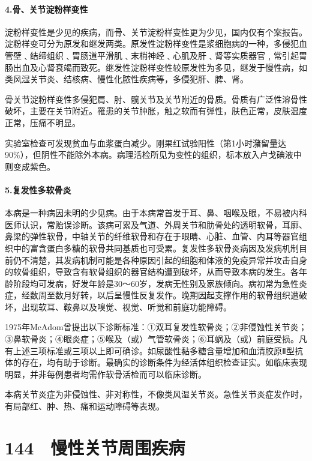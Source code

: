 \paragraph{4.骨、关节淀粉样变性}

淀粉样变性是少见的疾病，而骨、关节淀粉样变性更为少见，国内仅有个案报告。淀粉样变可分为原发和继发两类。原发性淀粉样变性是浆细胞病的一种，多侵犯血管壁﹑结缔组织﹑胃肠道平滑肌﹑末梢神经﹑心肌及肝﹑肾等实质器官﹐常引起胃肠出血及心肾衰竭而致死。继发性淀粉样变性较原发性为多见，继发于慢性病，如类风湿关节炎、结核病、慢性化脓性疾病等，多侵犯肝、脾、肾。

骨关节淀粉样变性多侵犯肩、肘、髋关节及关节附近的骨质。骨质有广泛性溶骨性破坏，主要在关节附近。罹患的关节肿胀，触之软而有弹性，肤色正常，皮肤温度正常，压痛不明显。

实验室检查可发现贫血与血浆蛋白减少。刚果红试验阳性（第1小时潴留量达90\%），但阴性不能除外本病。病理活检所见为变性的组织，标本放入卢戈碘液中则变成紫色。

\paragraph{5.复发性多软骨炎}

本病是一种病因未明的少见病。由于本病常首发于耳、鼻、咽喉及眼，不易被内科医师认识，常贻误诊断。该病可累及气道、外周关节和肋骨处的透明软骨，耳廓、鼻梁的弹性软骨，中轴关节的纤维软骨和存在于眼睛、心脏、血管、内耳等器官组织中的富含蛋白多糖的软骨共同基质也可受累。复发性多软骨炎病因及发病机制目前仍不清楚，其发病机制可能是各种原因引起的细胞和体液的免疫异常并攻击自身的软骨组织，导致含有软骨组织的器官结构遭到破坏，从而导致本病的发生。各年龄阶段均可发病，好发年龄是30～60岁，发病无性别及家族倾向。病初常为急性炎症，经数周至数月好转，以后呈慢性反复发作。晚期因起支撑作用的软骨组织遭破坏，出现软耳、鞍鼻以及嗅觉、视觉、听觉和前庭功能障碍。

1975年McAdom曾提出以下诊断标准：①双耳复发性软骨炎；②非侵蚀性关节炎；③鼻软骨炎；④眼炎症；⑤喉及（或）气管软骨炎；⑥耳蜗及（或）前庭受损。凡有上述三项标准或三项以上即可确诊。如尿酸性黏多糖含量增加和血清胶原Ⅱ型抗体的存在，均有助于诊断。最确实的诊断条件为经活体组织检查证实。如临床表现明显，并非每例患者均需作软骨活检而可以临床诊断。

本病关节炎症为非侵蚀性、非对称性，不像类风湿关节炎。急性关节炎症发作时，有局部红、肿、热、痛和运动障碍等表现。

\protect\hypertarget{text00330.html}{}{}

\section{144　慢性关节周围疾病}

